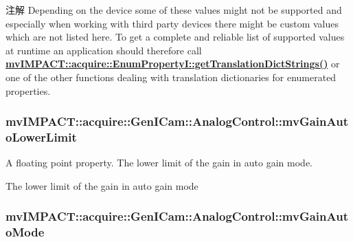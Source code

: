 \begin{DoxyNote}{注解}
Depending on the device some of these values might not be supported and especially when working with third party devices there might be custom values which are not listed here. To get a complete and reliable list of supported values at runtime an application should therefore call {\bfseries \hyperlink{classmv_i_m_p_a_c_t_1_1acquire_1_1_enum_property_i_a0ba6ccbf5ee69784d5d0b537924d26b6}{mv\+I\+M\+P\+A\+C\+T\+::acquire\+::\+Enum\+Property\+I\+::get\+Translation\+Dict\+Strings()}} or one of the other functions dealing with translation dictionaries for enumerated properties. 
\end{DoxyNote}
\hypertarget{classmv_i_m_p_a_c_t_1_1acquire_1_1_gen_i_cam_1_1_analog_control_aee3664e17216fc642f704fc52a4cbbbe}{
\subsubsection[{mv\+Gain\+Auto\+Lower\+Limit}]{ mv\+I\+M\+P\+A\+C\+T\+::acquire\+::\+Gen\+I\+Cam\+::\+Analog\+Control\+::mv\+Gain\+Auto\+Lower\+Limit}}\label{classmv_i_m_p_a_c_t_1_1acquire_1_1_gen_i_cam_1_1_analog_control_aee3664e17216fc642f704fc52a4cbbbe}


A floating point property. The lower limit of the gain in auto gain mode. 

The lower limit of the gain in auto gain mode \hypertarget{classmv_i_m_p_a_c_t_1_1acquire_1_1_gen_i_cam_1_1_analog_control_a896d827496c9bf28f115176b68b5ce27}{
\subsubsection[{mv\+Gain\+Auto\+Mode}]{ mv\+I\+M\+P\+A\+C\+T\+::acquire\+::\+Gen\+I\+Cam\+::\+Analog\+Control\+::mv\+Gain\+Auto\+Mode}}\label{classmv_i_m_p_a_c_t_1_1acquire_1_1_gen_i_cam_1_1_analog_control_a896d827496c9bf28f115176b68b5ce27}



